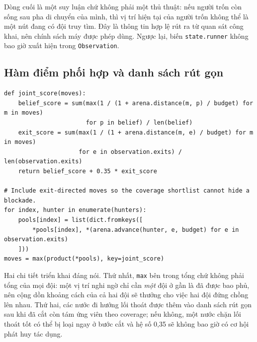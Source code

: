 Dòng cuối là một suy luận chứ không phải một thủ thuật: nếu người trốn còn sống
sau pha di chuyển của mình, thì vị trí hiện tại của người trốn không thể là một nút
đang có đội truy tìm. Đây là thông tin hợp lệ rút ra từ quan sát công khai, nên
chính sách máy được phép dùng. Ngược lại, biến \texttt{state.runner} không bao giờ
xuất hiện trong \texttt{Observation}.

\subsection{Hàm điểm phối hợp và danh sách rút gọn}

\begin{lstlisting}[caption={Chiến thuật phối hợp chặn lối thoát},label={lst:contain}]
def joint_score(moves):
    belief_score = sum(max(1 / (1 + arena.distance(m, p) / budget) for m in moves)
                       for p in belief) / len(belief)
    exit_score = sum(max(1 / (1 + arena.distance(m, e) / budget) for m in moves)
                     for e in observation.exits) / len(observation.exits)
    return belief_score + 0.35 * exit_score

# Include exit-directed moves so the coverage shortlist cannot hide a blockade.
for index, hunter in enumerate(hunters):
    pools[index] = list(dict.fromkeys([
        *pools[index], *(arena.advance(hunter, e, budget) for e in observation.exits)
    ]))
moves = max(product(*pools), key=joint_score)
\end{lstlisting}

Hai chi tiết triển khai đáng nói. Thứ nhất, \texttt{max} bên trong tổng chứ không
phải tổng của mọi đội: một vị trí nghi ngờ chỉ cần \textit{một} đội ở gần là đã
được bao phủ, nên cộng dồn khoảng cách của cả hai đội sẽ thưởng cho việc hai đội
đứng chồng lên nhau. Thứ hai, các nước đi hướng lối thoát được thêm vào danh sách
rút gọn sau khi đã cắt còn tám ứng viên theo coverage; nếu không, một nước chặn
lối thoát tốt có thể bị loại ngay ở bước cắt và hệ số 0,35 sẽ không bao giờ có cơ
hội phát huy tác dụng.
